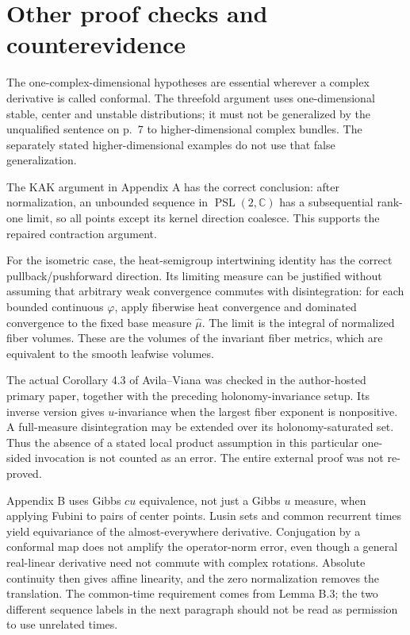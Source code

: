 \documentclass[10pt]{article}
\begin{document}
\section*{Other proof checks and counterevidence}
The one-complex-dimensional hypotheses are essential wherever a complex derivative is called conformal. The threefold argument uses one-dimensional stable, center and unstable distributions; it must not be generalized by the unqualified sentence on p. 7 to higher-dimensional complex bundles. The separately stated higher-dimensional examples do not use that false generalization.\par
The KAK argument in Appendix A has the correct conclusion: after normalization, an unbounded sequence in \(\operatorname{PSL}(2,\mathbb C)\) has a subsequential rank-one limit, so all points except its kernel direction coalesce. This supports the repaired contraction argument.\par
For the isometric case, the heat-semigroup intertwining identity has the correct pullback/pushforward direction. Its limiting measure can be justified without assuming that arbitrary weak convergence commutes with disintegration: for each bounded continuous \(\varphi\), apply fiberwise heat convergence and dominated convergence to the fixed base measure \(\widehat\mu\). The limit is the integral of normalized fiber volumes. These are the volumes of the invariant fiber metrics, which are equivalent to the smooth leafwise volumes.\par
The actual Corollary 4.3 of Avila–Viana was checked in the author-hosted primary paper, together with the preceding holonomy-invariance setup. Its inverse version gives \(u\)-invariance when the largest fiber exponent is nonpositive. A full-measure disintegration may be extended over its holonomy-saturated set. Thus the absence of a stated local product assumption in this particular one-sided invocation is not counted as an error. The entire external proof was not re-proved.\par
Appendix B uses Gibbs \(cu\) equivalence, not just a Gibbs \(u\) measure, when applying Fubini to pairs of center points. Lusin sets and common recurrent times yield equivariance of the almost-everywhere derivative. Conjugation by a conformal map does not amplify the operator-norm error, even though a general real-linear derivative need not commute with complex rotations. Absolute continuity then gives affine linearity, and the zero normalization removes the translation. The common-time requirement comes from Lemma B.3; the two different sequence labels in the next paragraph should not be read as permission to use unrelated times.\par
\end{document}
